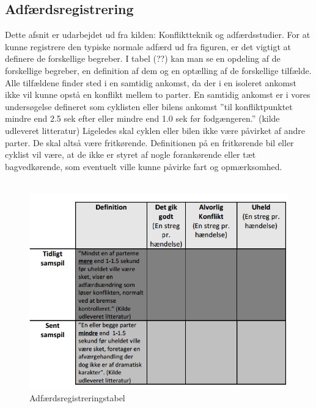 \subsection{Adfærdsregistrering}
\label{sub:adfregis}
Dette afsnit er udarbejdet ud fra kilden: Konfliktteknik og adfærdsstudier.
For	at kunne registrere den typiske normale adfærd ud	 fra figuren, er det vigtigt at definere	de	forskellige	begreber. I tabel (??) kan man se en	opdeling af de forskellige begreber, en definition af dem og en optælling af de forskellige tilfælde. Alle	tilfældene finder sted i	en samtidig ankomst, da der i en isoleret ankomst	 ikke vil kunne	opstå en konflikt mellem to parter. En samtidig ankomst er i vores undersøgelse defineret som cyklisten eller bilens ankomst ”til konfliktpunktet mindre end 2.5 sek efter eller mindre end 1.0 sek før fodgængeren.” (kilde udleveret	litteratur)	Ligeledes skal cyklen	eller bilen ikke være påvirket af andre parter. De skal altså være fritkørende. Definitionen på en fritkørende bil eller cyklist	vil	være, at de ikke er styret af nogle	forankørende eller tæt bagvedkørende, som eventuelt ville kunne påvirke fart og opmærksomhed.
\\\\
\begin{figure}[htbp]
  \centering
  \begin{adjustbox}{max width=\textwidth}
    \includegraphics{figures/Billederogfigur/obstabel.png} %
 \end{adjustbox}
  \caption{Adfærdsregistreringstabel}
  \label{fig:adfregtabel}
\end{figure}
